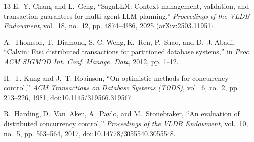 \documentclass[conference,10pt]{IEEEtran}
\begin{document}
\begin{thebibliography}{13}
E.~Y. Chang and L.~Geng, ``SagaLLM: Context management, validation, and transaction guarantees for multi-agent LLM planning,'' \emph{Proceedings of the VLDB Endowment}, vol.~18, no.~12, pp. 4874--4886, 2025 (arXiv:2503.11951).

A.~Thomson, T.~Diamond, S.-C. Weng, K.~Ren, P.~Shao, and D.~J. Abadi, ``Calvin: Fast distributed transactions for partitioned database systems,'' in \emph{Proc. ACM SIGMOD Int. Conf. Manage. Data}, 2012, pp. 1--12.

H.~T. Kung and J.~T. Robinson, ``On optimistic methods for concurrency control,'' \emph{ACM Transactions on Database Systems (TODS)}, vol.~6, no.~2, pp. 213--226, 1981, doi:10.1145/319566.319567.

R.~Harding, D.~Van~Aken, A.~Pavlo, and M.~Stonebraker, ``An evaluation of distributed concurrency control,'' \emph{Proceedings of the VLDB Endowment}, vol.~10, no.~5, pp. 553--564, 2017, doi:10.14778/3055540.3055548.

\end{thebibliography}
\end{document}
